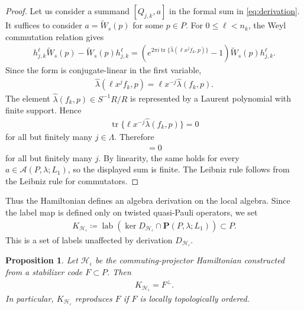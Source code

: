 \documentclass[sn-mathphys-num]{sn-jnl}
\newtheorem{proposition}[lemma]{Proposition}
\theoremstyle{definition}
\numberwithin{equation}{section}
\theoremstyle{definition}
\def\CA{{\mathcal A}}
\def\CH {{\mathcal H}}
\def\La{{\Lambda}}
\def\l{{\lambda}}
\def\hl{{\hat \lambda}}
\def\ker{\operatorname{ker}}
\def\tr{\operatorname{tr}}
\def\lab{\operatorname{lab}}
\begin{document}
\begin{proof}
Let us consider a summand $[Q_{j,k},a]$ in the formal sum in \eqref{eq:derivation}. It suffices to consider $a=\widetilde W_s(p)$ for some $p\in P$. For
$0\leqslant\ell<n_k$, the Weyl commutation relation gives
\begin{align}
    h_{j,k}^{\ell}\widetilde W_s(p)
    -
    \widetilde W_s(p)h_{j,k}^{\ell}
    =
    \left(
        e^{2\pi i\tr\{\hl(\ell x^jf_k,p)\}}-1
    \right)
    \widetilde W_s(p)h_{j,k}^{\ell}.
\end{align}
Since the form is conjugate-linear in the first variable,
\begin{align}
    \hl(\ell x^jf_k,p)
    =
    \ell x^{-j}\hl(f_k,p).
\end{align}
The element $\hl(f_k,p)\in S^{-1}R/R$ is represented by a Laurent
polynomial with finite support. Hence
\begin{align}
    \tr\{\ell x^{-j}\hl(f_k,p)\}=0
\end{align}
for all but finitely many $j\in\La$. Therefore
\begin{align}
    [Q_{j,k},\widetilde W_s(p)]=0
\end{align}
for all but finitely many $j$. By linearity, the same holds for every
$a\in\CA(P,\l;L_1)$, so the displayed sum is finite. The Leibniz rule
follows from the Leibniz rule for commutators.
\end{proof}

Thus the Hamiltonian defines an algebra derivation on the local algebra. Since the label map is defined only on twisted quasi-Pauli operators, we set
\begin{align}\label{eq:hamiltonian_centralizer_labels}
    K_{\CH_{\iota}}
    \coloneqq
    \lab\left(
        \ker D_{\CH_{\iota}}
        \cap \textbf{P}(P,\l;L_1)
    \right)
    \subset P.
\end{align}
This is a set of labels unaffected by derivation $D_{\CH_{\iota}}$.

\begin{proposition}\label{prop:recover_code_from_hamiltonian}
Let $\CH_{\iota}$ be the commuting-projector Hamiltonian constructed from a
stabilizer code $F\subset P$. Then
\begin{align}\label{eq:hamiltonian_centralizer_equals_orthogonal}
    K_{\CH_{\iota}}=F^{\perp}.
\end{align}
In particular, $K_{\CH_{\iota}}$ reproduces $F$ if $F$ is locally topologically ordered.
\end{proposition}
\end{document}
